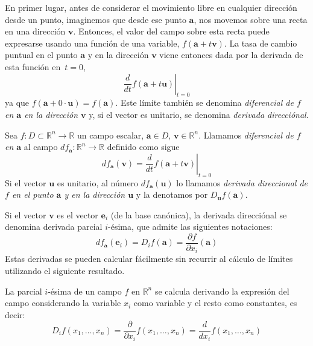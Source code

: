 En primer lugar, antes de considerar el movimiento libre en cualquier dirección desde un punto, imaginemos que desde ese punto $\boldsymbol a$, nos movemos sobre una recta en una dirección $\boldsymbol v$.
Entonces, el valor del campo sobre esta recta puede expresarse usando una función de una variable, $f(\boldsymbol a+t\boldsymbol v)$. La tasa de cambio puntual en el punto $\boldsymbol a$ y en la dirección $\boldsymbol v$ viene entonces dada por la derivada de esta función en~$t=0$,
\[
\left.\frac{d}{dt}f(\boldsymbol a +t\boldsymbol u)\right|_{t=0}
\]
ya que $f(\boldsymbol a +0\cdot\boldsymbol u)=f(\boldsymbol a)$.
Este límite también se denomina \emph{diferencial de $f$ en $\boldsymbol a$ en la dirección $\boldsymbol v$} y, si el vector es unitario, se denomina \emph{derivada direcciónal}.
%
\begin{definicion}
Sea $f\colon \mathit{D}\subset \mathbb{R}^n\to \mathbb{R}$ un campo escalar, $\boldsymbol a\in \mathit{D}$, $\boldsymbol v\in\mathbb{R}^n$.
Llamamos \emph{diferencial de $f$ en $\boldsymbol a$} al campo $df_{\boldsymbol a}\colon\mathbb{R}^n\to\mathbb{R}$ definido como sigue
\[
df_{\boldsymbol a}(\boldsymbol v) = \left.\frac{d}{dt}f(\boldsymbol a +t\boldsymbol v)\right|_{t=0}
\]
Si el vector $\boldsymbol u$ es unitario, al número $df_{\boldsymbol a}(\boldsymbol u)$ lo llamamos
\emph{derivada direccional de $f$ en el punto $\boldsymbol a$ y en la dirección $\boldsymbol u$} y la denotamos 
por $D_{\boldsymbol u}f(\boldsymbol a)$.
\end{definicion}

Si el vector $\boldsymbol v$ es el vector $\boldsymbol e_i$ (de la base canónica), la derivada direcciónal se denomina derivada parcial $i$-ésima, que admite las siguientes notaciones:
\begin{equation}\label{def:parcial}
df_{\boldsymbol a}(\boldsymbol e_i) = D_if(\boldsymbol a)= \dfrac{\partial f}{\partial x_i}(\boldsymbol a)
\end{equation}
Estas derivadas se pueden calcular fácilmente sin recurrir al cálculo de límites utilizando el siguiente resultado.
%
\begin{proposicion}
La parcial $i$-ésima de un campo $f$ en $\mathbb{R}^n$ se calcula derivando la expresión del campo considerando la variable $x_i$ como variable y el resto como constantes, es decir:
\[
D_if(x_1,\dots,x_n)=\frac{\partial}{\partial x_i} f(x_1,\dots,x_n) = \frac{d}{dx_i}f(x_1,\dots,x_n)
\]
\end{proposicion}

